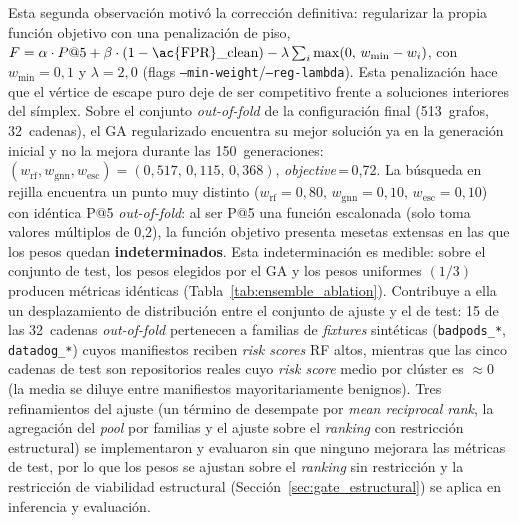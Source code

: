 Esta segunda observación motivó la corrección definitiva: regularizar la propia
función objetivo con una penalización de piso,
\(F = \alpha \cdot P@5 + \beta \cdot (1-\text{\ac{FPR}\_clean}) -
\lambda \sum_i \max(0,\, w_{\min} - w_i)\), con \(w_{\min}=0{,}1\) y
\(\lambda=2{,}0\) (flags \texttt{--min-weight}/\texttt{--reg-lambda}). Esta
penalización hace que el vértice de escape puro deje de ser competitivo frente a
soluciones interiores del símplex. Sobre el conjunto \textit{out-of-fold} de la
configuración final (513~grafos, 32~cadenas), el \ac{GA} regularizado encuentra
su mejor solución ya en la generación inicial y no la mejora durante las
150~generaciones:
\((w_{\text{rf}}, w_{\text{gnn}}, w_{\text{esc}}) = (0{,}517,\, 0{,}115,\, 0{,}368)\),
\textit{objective}\,=\,0,72. La búsqueda en rejilla encuentra un punto muy
distinto (\(w_{\text{rf}}=0{,}80,\, w_{\text{gnn}}=0{,}10,\,
w_{\text{esc}}=0{,}10\)) con idéntica P@5 \textit{out-of-fold}: al ser P@5 una
función escalonada (solo toma valores múltiplos de 0,2), la función objetivo
presenta mesetas extensas en las que los pesos quedan \textbf{indeterminados}.
Esta indeterminación es medible: sobre el conjunto de test, los pesos elegidos
por el \ac{GA} y los pesos uniformes \((1/3)\) producen métricas idénticas
(Tabla~\ref{tab:ensemble_ablation}). Contribuye a ella un desplazamiento de
distribución entre el conjunto de ajuste y el de test: 15 de las 32~cadenas
\textit{out-of-fold} pertenecen a familias de \textit{fixtures} sintéticas
(\texttt{badpods\_*}, \texttt{datadog\_*}) cuyos manifiestos reciben
\textit{risk scores} \ac{RF} altos, mientras que las cinco cadenas de test son
repositorios reales cuyo \textit{risk score} medio por clúster es
\(\approx\)0 (la media se diluye entre manifiestos mayoritariamente benignos).
Tres refinamientos del ajuste (un término de desempate por \textit{mean
reciprocal rank}, la agregación del \textit{pool} por familias y el ajuste sobre
el \textit{ranking} con restricción estructural) se implementaron y evaluaron
sin que ninguno mejorara las métricas de test, por lo que los pesos se ajustan
sobre el \textit{ranking} sin restricción y la restricción de viabilidad
estructural (Sección~\ref{sec:gate_estructural}) se aplica en inferencia y
evaluación.

